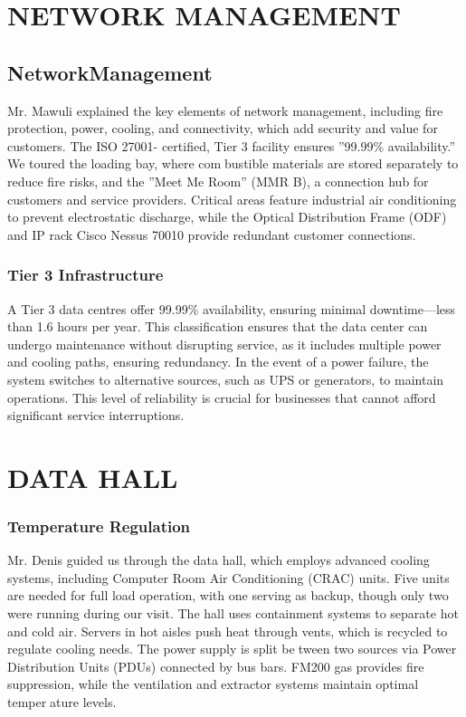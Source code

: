 \documentclass[12pt]{report}
\begin{document}
\chapter{NETWORK MANAGEMENT}
\section{Network\hspace{0.5cm}Management}\begin{flushleft}
	Mr. Mawuli explained the key elements of network management, including fire protection,
	power, cooling, and connectivity, which add security and value for customers. The ISO 27001-
	certified, Tier 3 facility ensures ”99.99\% availability.” We toured the loading bay, where combustible materials are stored separately to reduce fire risks, and the ”Meet Me Room” (MMR
	B), a connection hub for customers and service providers. Critical areas feature industrial air
	conditioning to prevent electrostatic discharge, while the Optical Distribution Frame (ODF) and
	IP rack Cisco Nessus 70010 provide redundant customer connections.\\[0.3cm]


\subsection{Tier 3 Infrastructure}
\begin{justify}
	A Tier 3 data centres offer 99.99\% availability, ensuring minimal downtime—less than 1.6
	hours per year. This classification ensures that the data center can undergo maintenance without
	disrupting service, as it includes multiple power and cooling paths, ensuring redundancy. In the
	event of a power failure, the system switches to alternative sources, such as UPS or generators,
	to maintain operations. This level of reliability is crucial for businesses that cannot afford
	significant service interruptions.
\end{justify}


\chapter{DATA HALL}

\subsection{Temperature Regulation}
\begin{justify}
	Mr. Denis guided us through the data hall, which employs advanced cooling systems, including
	Computer Room Air Conditioning (CRAC) units. Five units are needed for full load operation,
	with one serving as backup, though only two were running during our visit.
	The hall uses containment systems to separate hot and cold air. Servers in hot aisles push
	heat through vents, which is recycled to regulate cooling needs. The power supply is split between two sources via Power Distribution Units (PDUs) connected by bus bars. FM200 gas
	provides fire suppression, while the ventilation and extractor systems maintain optimal temperature levels.
\end{justify}

\end{flushleft}
\end{document}
